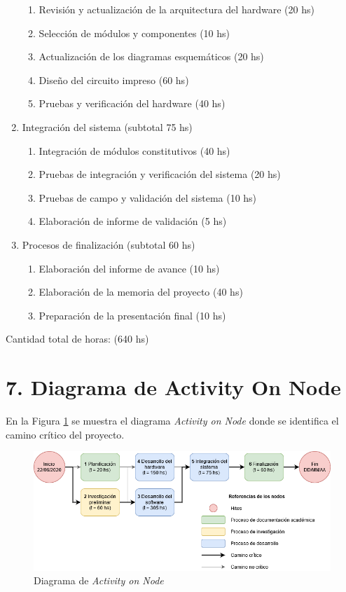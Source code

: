 \documentclass[11pt]{charter}
\begin{document}
\begin{enumerate}
  \begin{enumerate}
  \item Revisión y actualización de la arquitectura del hardware \hfill (20 hs)
  \item Selección de módulos y componentes \hfill (10 hs)
  \item Actualización de los diagramas esquemáticos \hfill (20 hs)
  \item Diseño del circuito impreso \hfill (60 hs)
  \item Pruebas y verificación del hardware \hfill (40 hs)
  \end{enumerate}
\item Integración del sistema \hfill (subtotal 75 hs)
  \begin{enumerate}
  \item Integración de módulos constitutivos \hfill (40 hs)
  \item Pruebas de integración y verificación del sistema \hfill (20 hs)
  \item Pruebas de campo y validación del sistema \hfill (10 hs)
  \item Elaboración de informe de validación \hfill (5 hs)
  \end{enumerate}
\item Procesos de finalización \hfill (subtotal 60 hs)
  \begin{enumerate}
  \item Elaboración del informe de avance \hfill (10 hs)
  \item Elaboración de la memoria del proyecto \hfill (40 hs)
  \item Preparación de la presentación final \hfill (10 hs)
  \end{enumerate}
\end{enumerate}

Cantidad total de horas: (640 hs)

\newpage

\section{7. Diagrama de Activity On Node}
\label{sec:AoN}

En la Figura \ref{fig:AoN} se muestra el diagrama \textit{Activity on Node} donde se identifica el camino crítico del proyecto.

\begin{figure}[htpb]
\centering 
\includegraphics[width=1\textwidth]{./Figuras/activity_on_node.png}
\caption{Diagrama de \textit{Activity on Node}}
\label{fig:AoN}
\end{figure}
\end{document}
